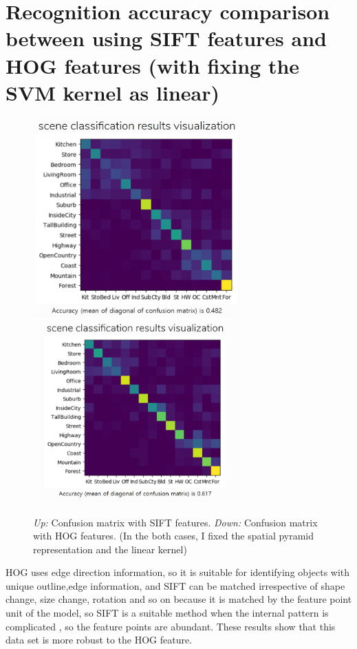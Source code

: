 \section*{Recognition accuracy comparison between using SIFT features and HOG features (with fixing the SVM kernel as linear)}
\begin{figure}[h]
    \centering
    \includegraphics[width=8cm]{confusift.png}
    \includegraphics[width=8cm]{confulinear.png}
    \caption{\emph{Up:} Confusion matrix with SIFT features. \emph{Down:} Confusion matrix with HOG features. (In the both cases, I fixed the spatial pyramid representation and the linear kernel)}
    \label{fig:result1}
\end{figure}

HOG uses edge direction information, so it is suitable for identifying objects with unique outline,edge information, and SIFT can be matched irrespective of shape change, size change, rotation and so on because it is matched by the feature point unit of the model, so SIFT is a suitable method when the internal pattern is complicated , so the feature points are abundant. These results show that this data set is more robust to the HOG feature.

